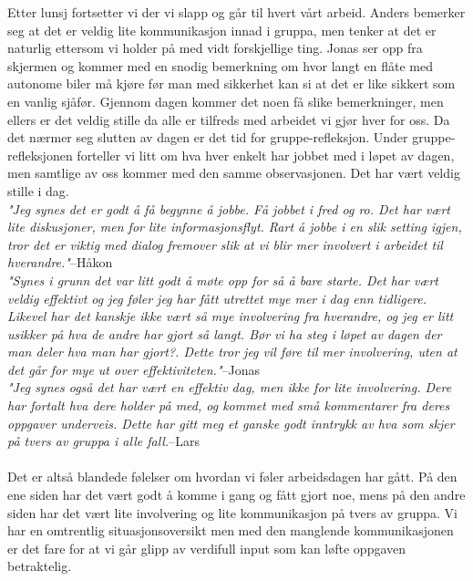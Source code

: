 Etter lunsj fortsetter vi der vi slapp og går til hvert vårt arbeid. Anders bemerker seg at det er veldig lite kommunikasjon innad i gruppa, men tenker at det er naturlig ettersom vi holder på med vidt forskjellige ting. Jonas ser opp fra skjermen og kommer med en snodig bemerkning om hvor langt en flåte med autonome biler må kjøre før man med sikkerhet kan si at det er like sikkert som en vanlig sjåfør. Gjennom dagen kommer det noen få slike bemerkninger, men ellers er det veldig stille da alle er tilfreds med arbeidet vi gjør hver for oss. Da det nærmer seg slutten av dagen er det tid for gruppe-refleksjon. Under gruppe-refleksjonen forteller vi litt om hva hver enkelt har jobbet med i løpet av dagen, men samtlige av oss kommer med den samme observasjonen. Det har vært veldig stille i dag.\\ 

\textit{"Jeg synes det er godt å få begynne å jobbe. Få jobbet i fred og ro. Det har vært lite diskusjoner, men for lite informasjonsflyt. Rart å jobbe i en slik setting igjen, tror det er viktig med dialog fremover slik at vi blir mer involvert i arbeidet til hverandre."}{--Håkon}\\

\textit{"Synes i grunn det var litt godt å møte opp for så å bare starte. Det har vært veldig effektivt og jeg føler jeg har fått utrettet mye mer i dag enn tidligere. Likevel har det kanskje ikke vært så mye involvering fra hverandre, og jeg er litt usikker på hva de andre har gjort så langt. Bør vi ha steg i løpet av dagen der man deler hva man har gjort?. Dette tror jeg vil føre til mer involvering, uten at det går for mye ut over effektiviteten."}{--Jonas}\\

\textit{"Jeg synes også det har vært en effektiv dag, men ikke for lite involvering. Dere har fortalt hva dere holder på med, og kommet med små kommentarer fra deres oppgaver underveis. Dette har gitt meg et ganske godt inntrykk av hva som skjer på tvers av gruppa i alle fall.}{--Lars}\\
\\
Det er altså blandede følelser om hvordan vi føler arbeidsdagen har gått. På den ene siden har det vært godt å komme i gang og fått gjort noe, mens på den andre siden har det vært lite involvering og lite kommunikasjon på tvers av gruppa. Vi har en omtrentlig situasjonsoversikt men med den manglende kommunikasjonen er det fare for at vi går glipp av verdifull input som kan løfte oppgaven betraktelig.\\



